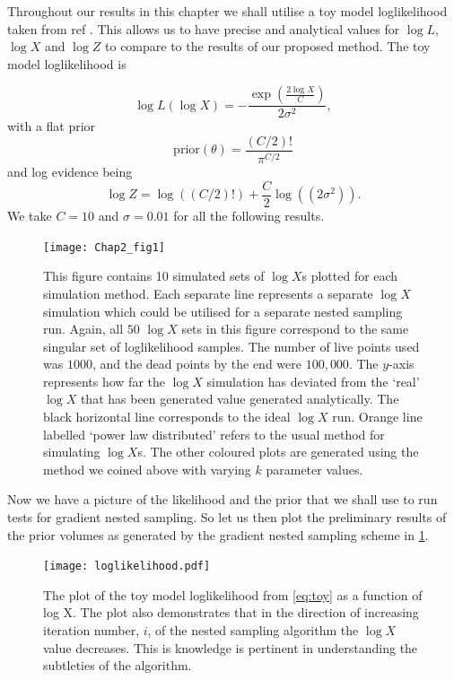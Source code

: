Throughout our results in this chapter we shall utilise a toy model loglikelihood taken from ref \cite{10.1214/06-BA127}. This allows us to have precise and analytical values for $\log L$, $\log X$ and $\log Z$ to compare to the results of our proposed method. The toy model loglikelihood is

\begin{equation}
    \log L(\log X) = -\frac{\exp (\frac{2\log X}{C}) }{2 \sigma^2},
\label{eq:toy}
\end{equation}
%
with a flat prior 
%
\begin{equation}
    \mathrm{prior}(\theta) = \frac{(C/2)!}{\pi^{C/2}}
\end{equation}
%
and log evidence being 
%
\begin{equation}
   \log Z = \log( (C/2)!) + \frac{C}{2}\log ((2\sigma^2)).
\end{equation}
%
We take $C=10$ and $\sigma = 0.01$ for all the following results.

\begin{figure} 
\centering    
\texttt{[image: Chap2\_fig1]}
\caption{This figure contains 10 simulated sets of $\log X$s plotted for each simulation method. Each separate line represents a separate $\log X$ simulation which could be utilised for a separate nested sampling run. Again, all $50$ $\log X$ sets in this figure correspond to the same singular set of loglikelihood samples. The number of live points used was $1000$, and the dead points by the end were $100,000$. The $y$-axis represents how far the $\log X$ simulation has deviated from the `real' $\log X$ that has been generated value generated analytically. The black horizontal line corresponds to the ideal $\log X$ run. Orange line labelled `power law distributed' refers to the usual method for simulating $\log X$s. The other coloured plots are generated using the method we coined above with varying $k$ parameter values.}
\label{fig:logX1}
\end{figure}

Now we have a picture of the likelihood and the prior that we shall use to run tests for gradient nested sampling. So let us then plot the preliminary results of the prior volumes as generated by the gradient nested sampling scheme in \cref{fig:logX1}.
%

\begin{figure} 
\centering    
\texttt{[image: loglikelihood.pdf]}
\caption{ The plot of the toy model loglikelihood from \cref{eq:toy} as a function of log X. The plot also demonstrates that in the direction of increasing iteration number, $i$, of the nested sampling algorithm the $\log X$ value decreases. This is knowledge is pertinent in understanding the subtleties of the algorithm.}
\label{fig:expo}
\end{figure}

